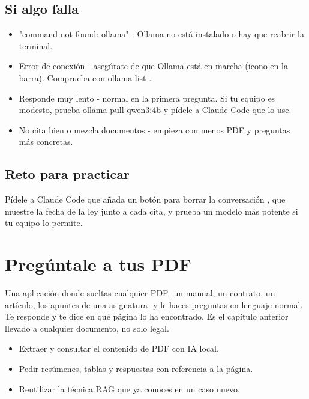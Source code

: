 \documentclass[11pt,a4paper]{book}
\begin{document}
\section{Si algo falla}
\begin{itemize}\item "command not found: ollama" - Ollama no está instalado o hay que reabrir la terminal.\end{itemize}
\begin{itemize}\item Error de conexión - asegúrate de que Ollama está en marcha (icono en la barra). Comprueba con ollama list .\end{itemize}
\begin{itemize}\item Responde muy lento - normal en la primera pregunta. Si tu equipo es modesto, prueba ollama pull qwen3:4b y pídele a Claude Code que lo use.\end{itemize}
\begin{itemize}\item No cita bien o mezcla documentos - empieza con menos PDF y preguntas más concretas.\end{itemize}
\section{Reto para practicar}
Pídele a Claude Code que añada un botón para borrar la conversación , que muestre la fecha de la ley junto a cada cita, y prueba un modelo más potente si tu equipo lo permite.

\chapter{Pregúntale a tus PDF}
Una aplicación donde sueltas cualquier PDF -un manual, un contrato, un artículo, los apuntes de una asignatura- y le haces preguntas en lenguaje normal. Te responde y te dice en qué página lo ha encontrado. Es el capítulo anterior llevado a cualquier documento, no solo legal.

\begin{itemize}\item Extraer y consultar el contenido de PDF con IA local.\end{itemize}
\begin{itemize}\item Pedir resúmenes, tablas y respuestas con referencia a la página.\end{itemize}
\begin{itemize}\item Reutilizar la técnica RAG que ya conoces en un caso nuevo.\end{itemize}
\end{document}

